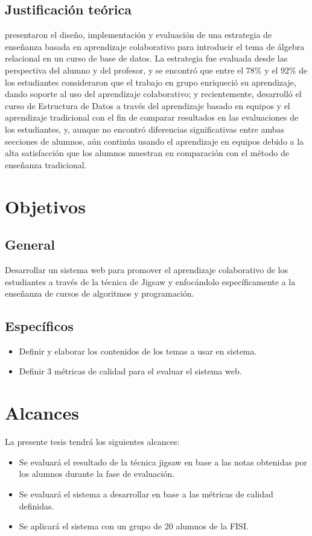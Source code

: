 \subsection{Justificación teórica}
 presentaron el diseño, implementación y evaluación de una estrategia de enseñanza basada en aprendizaje colaborativo para introducir el tema de álgebra relacional en un curso de base de datos. La estrategia fue evaluada desde las perspectiva del alumno y del profesor, y se encontró que entre el $78\%$ y el $92\%$ de los estudiantes consideraron que el trabajo en grupo enriqueció su aprendizaje, dando soporte al uso del aprendizaje colaborativo; y recientemente,  desarrolló el curso de Estructura de Datos a través del aprendizaje basado en equipos y el aprendizaje tradicional con el fin de comparar resultados en las evaluaciones de los estudiantes, y, aunque no encontró diferencias significativas entre ambas secciones de alumnos, aún continúa usando el aprendizaje en equipos debido a la alta satisfacción que los alumnos muestran en comparación con el método de enseñanza tradicional.\\


\section{Objetivos}
\subsection{General}
Desarrollar un sistema web para promover el aprendizaje colaborativo de los estudiantes a través de la técnica de Jigsaw y enfocándolo específicamente a la enseñanza de cursos de algoritmos y programación.
\subsection{Específicos}
\begin{itemize}
	\item Definir y elaborar los contenidos de los temas a usar  en sistema.
  \item Definir 3 métricas de calidad para el evaluar el sistema web.
\end{itemize}

\section{Alcances}
La presente tesis tendrá los siguientes alcances:
\begin{itemize}
  \item Se evaluará el resultado de la técnica jigsaw en base a las notas obtenidas por los alumnos durante la fase de evaluación.
  \item Se evaluará el sistema a desarrollar en base a las métricas de calidad definidas.
  \item Se aplicará el sistema con un grupo de 20 alumnos de la FISI.
\end{itemize}

